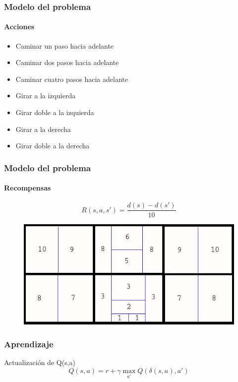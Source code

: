 \documentclass{beamer}
\begin{document}
\begin{frame}
\frametitle{Modelo del problema}
\framesubtitle{Acciones}

\begin{itemize}
 \item Caminar un paso hacia adelante
 \item Caminar dos pasos hacia adelante
 \item Caminar cuatro pasos hacia adelante
 \item Girar a la izquierda
 \item Girar doble a la izquierda
 \item Girar a la derecha
 \item Girar doble a la derecha
\end{itemize}

\end{frame}


\begin{frame}
\frametitle{Modelo del problema}
\framesubtitle{Recompensas}

\begin{equation}
R(s,a,s') = \dfrac{d(s) - d(s')}{10}
\end{equation}

\begin{figure}[hbtp]
\centering
\includegraphics[scale=0.5]{Distancias2.jpg} 
\end{figure}

\end{frame}



\begin{frame}
\frametitle{Aprendizaje}


\begin{block}{Actualizaci\'on de Q(s,a)}
\begin{equation}
Q (s,a) = r + {\gamma\max_{a'}} Q(\delta(s ,a ) , a') 
\end{equation}
\end{block}

\end{frame}
\end{document}
